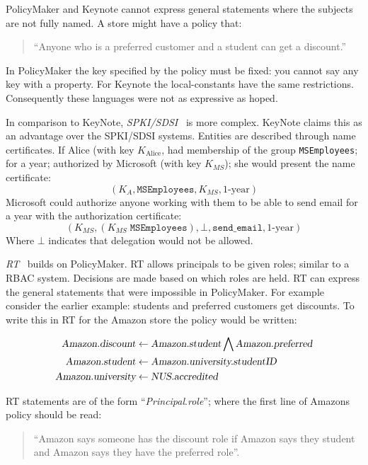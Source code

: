 \documentclass[a4paper]{article}
\begin{document}
PolicyMaker and Keynote cannot express
general statements where the subjects are not fully named.  A store
might have a policy that:
\begin{quote} ``Anyone who is a
  preferred customer and a student can get a discount.'' 
\end{quote}  
In PolicyMaker the key specified by the policy must be fixed: you cannot say any
key with a property.  For Keynote the local-constants have the same
restrictions.  Consequently these languages were not as expressive as hoped.


In comparison to KeyNote, \emph{SPKI/SDSI}~\cite{Ellison:1999ui} is more
complex.  KeyNote claims this as an advantage over the SPKI/SDSI systems.
Entities are described through name certificates.  If Alice (with key
$K_\text{Alice}$, had membership of the group \texttt{MSEmployees}; for a year;
authorized by Microsoft (with key $K_{MS}$); she would present the name
certificate: \[\left(K_A,\texttt{MSEmployees},K_{MS},\text{1-year}\right)\]
Microsoft could authorize anyone working with them to be able to send email for
a year with the authorization certificate:
\[\left(K_{MS},\left(K_{MS}\;\texttt{MSEmployees}\right),\bot,\texttt{send\_email},\text{1-year}\right)\]
Where $\bot$ indicates that delegation would not be allowed.  

\emph{RT}~\cite{Li:2002if} builds on PolicyMaker. RT allows principals to be
given roles; similar to a \ac{RBAC} system. Decisions are made based on which
roles are held.
RT can express the general statements that were impossible in PolicyMaker.
For example consider the earlier example: students and preferred customers get
discounts. To write this in RT for the Amazon store the policy would be written:

\begin{align*}
  \textsl{Amazon.discount}   & \gets  \textsl{Amazon.student} \bigwedge \textsl{Amazon.preferred} \\
  \textsl{Amazon.student}    & \gets  \textsl{Amazon.university.studentID}                        \\
  \textsl{Amazon.university} & \gets  \textsl{NUS.accredited}                                     \\
\end{align*}

RT statements are of the form ``\textsl{Principal}.\textsl{role}''; where the
first line of Amazons policy should be read: 
\begin{quote}
  ``Amazon says someone has the discount role if Amazon says they student and
  Amazon says  they have the preferred role''.
\end{quote}
\end{document}
